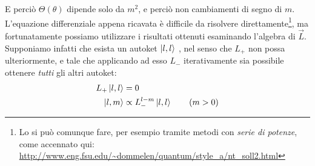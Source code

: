 \documentclass[../../FisicaTeorica.tex]{subfiles}
\begin{document}
E perciò $\Theta(\theta)$ dipende solo da $m^2$, e perciò non  cambiamenti di segno di $m$.\\
L'equazione differenziale appena ricavata è difficile da risolvere direttamente\footnote{Lo si può comunque fare, per esempio tramite metodi con \textit{serie di potenze}, come accennato qui: \url{http://www.eng.fsu.edu/~dommelen/quantum/style_a/nt_soll2.html}}, ma fortunatamente possiamo utilizzare i risultati ottenuti esaminando l'algebra di $\vec{L}$. Supponiamo infatti che esista un autoket $\ket{l,l}$ , nel senso che $L_+$ non possa  ulteriormente, e tale che applicando ad esso $L_-$ iterativamente sia possibile ottenere \textit{tutti} gli altri autoket:
\begin{align}
L_+ \ket{l,l}&=0 \label{eqn:autoket-max}\\
\ket{l,m} &\propto L_-^{l-m}\ket{l,l} \label{eqn:autoket-abbassato} \qquad (m>0)
\end{align}
 
\end{document}
